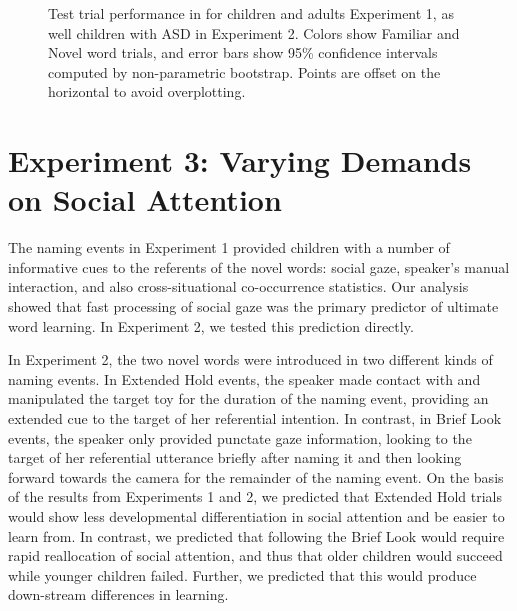 \documentclass{pnastwo}
\begin{document}
\begin{article}
\begin{figure}[tb]
	\caption{Test trial performance in for children and adults Experiment 1, as well children with ASD in Experiment 2. Colors show Familiar and Novel word trials, and error bars show 95\% confidence intervals computed by non-parametric bootstrap. Points are offset on the horizontal to avoid overplotting.}
	\label{fig:reflook_test} 
\end{figure}

\section{Experiment 3: Varying Demands on Social Attention}

The naming events in Experiment 1 provided children with a number of informative cues to the referents of the novel words: social gaze, speaker's manual interaction, and also cross-situational co-occurrence statistics. Our analysis showed that fast processing of social gaze was the primary predictor of ultimate word learning. In Experiment 2, we tested this prediction directly. 

In Experiment 2, the two novel words were introduced in two different kinds of naming events. In Extended Hold events, the speaker made contact with and manipulated the target toy for the duration of the naming event, providing an extended cue to the target of her referential intention. In contrast, in Brief Look events, the speaker only provided punctate gaze information, looking to the target of her referential utterance briefly after naming it and then looking forward towards the camera for the remainder of the naming event. On the basis of the results from Experiments 1 and 2, we predicted that Extended Hold trials would show less developmental differentiation in social attention and be easier to learn from. In contrast, we predicted that following the Brief Look would require rapid reallocation of social attention, and thus that older children would succeed while younger children failed. Further, we predicted that this would produce down-stream differences in learning.


\end{article}
\end{document}
